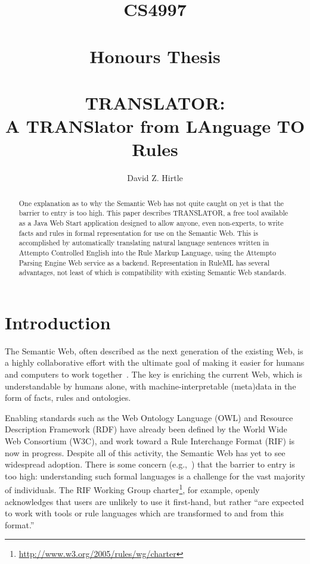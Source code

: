 \documentclass[12pt]{report}
\begin{document}
\title{CS4997\\\ \\Honours Thesis\\\ \\\textbf{TRANSLATOR:\\A TRANSlator from LAnguage TO Rules}}
\author{David Z. Hirtle}

\maketitle

\begin{abstract}
One explanation as to why the Semantic Web has not quite caught on yet is that the barrier to entry is too high. This paper describes TRANSLATOR, a free tool available as a Java Web Start application designed to allow anyone, even non-experts, to write facts and rules in formal representation for use on the Semantic Web. This is accomplished by automatically translating natural language sentences written in Attempto Controlled English into the Rule Markup Language, using the Attempto Parsing Engine Web service as a backend. Representation in RuleML has several advantages, not least of which is compatibility with existing Semantic Web standards.
\end{abstract}


\tableofcontents
\newpage



\setlength{\parskip}{0.85\baselineskip}
\setlength{\parindent}{0.0in}

\chapter{Introduction}
The Semantic Web, often described as the next generation of the existing Web, is a highly collaborative effort with the ultimate goal of making it easier for humans and computers to work together~\cite{berners-lee}. The key is enriching the current Web, which is understandable by humans alone, with machine-interpretable (meta)data in the form of facts, rules and ontologies.

Enabling standards such as the Web Ontology Language (OWL) and Resource Description Framework (RDF) have already been defined by the World Wide Web Consortium (W3C), and work toward a Rule Interchange Format (RIF) is now in progress. Despite all of this activity, the Semantic Web has yet to see widespread adoption. There is some concern (e.g.,~\cite{haustein}) that the barrier to entry is too high: understanding such formal languages is a challenge for the vast majority of individuals. The RIF Working Group charter\footnote{\url{http://www.w3.org/2005/rules/wg/charter}}, for example, openly acknowledges that users are unlikely to use it first-hand, but rather ``are expected to work with tools or rule languages which are transformed to and from this format.''
\end{document}
